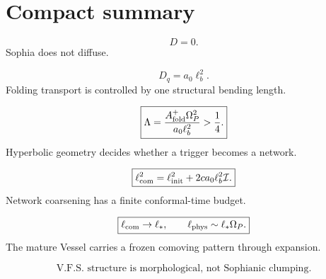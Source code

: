 \documentclass[11pt]{article}
\newcommand{\Op}{\Omega_P}
\newcommand{\Af}{A_{\rm fold}}
\newcommand{\Dq}{D_q}
\newcommand{\ellcom}{\ell_{\rm com}}
\newcommand{\ellphys}{\ell_{\rm phys}}
\newcommand{\ellinit}{\ell_{\rm init}}
\newcommand{\Lam}{\Lambda}
\newcommand{\Iconf}{\mathcal I}
\theoremstyle{definition}
\theoremstyle{plain}
\begin{document}
\section{Compact summary}

\[
\boxed{D=0.}
\]
Sophia does not diffuse.

\[
\boxed{\Dq=a_0\ell_b^2.}
\]
Folding transport is controlled by one structural bending length.

\[
\boxed{\Lam=\frac{\Af^+\Op^2}{a_0\ell_b^2}>\frac14.}
\]
Hyperbolic geometry decides whether a trigger becomes a network.

\[
\boxed{\ellcom^2=\ellinit^2+2ca_0\ell_b^2\Iconf.}
\]
Network coarsening has a finite conformal-time budget.

\[
\boxed{\ellcom\to\ell_\ast,
\qquad
\ellphys\sim\ell_\ast\Op.}
\]
The mature Vessel carries a frozen comoving pattern through expansion.

\[
\boxed{\text{V.F.S. structure is morphological, not Sophianic clumping.}}
\]
\end{document}
